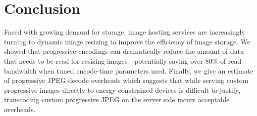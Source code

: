 \section{Conclusion}
    Faced with growing demand for storage, image hosting services are increasingly turning to dynamic image resizing to improve the efficiency of image storage.
We showed that progressive encodings can dramatically reduce the amount of data that needs to be read for resizing images---potentially saving over 80\% of read bandwidth when tuned encode-time parameters used.
Finally, we give an estimate of progressive JPEG decode overheads which suggests that while serving custom progressive images directly to energy-constrained devices is difficult to justify, transcoding custom progressive JPEG on the server side incurs acceptable overheads.

